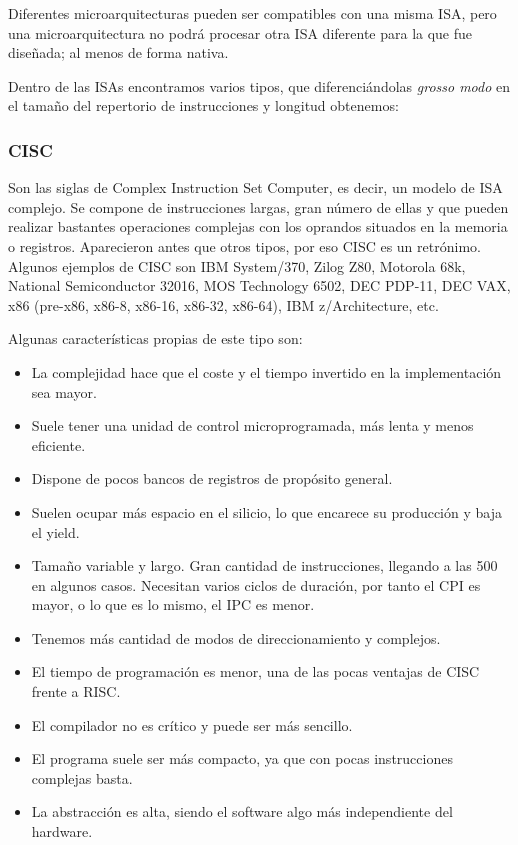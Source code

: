 \documentclass[a4paper, 11pt, titlepage]{article}
\begin{document}
            Diferentes microarquitecturas pueden ser compatibles con una misma ISA, pero una microarquitectura no 
            podrá procesar otra ISA diferente para la que fue diseñada; al menos de forma nativa.

            Dentro de las ISAs encontramos varios tipos, que diferenciándolas \textit{grosso modo} en el tamaño 
            del repertorio de instrucciones y longitud obtenemos:

        \subsubsection{CISC}
        
            Son las siglas de Complex Instruction Set Computer, es decir, un modelo de 
            ISA complejo. Se compone de instrucciones largas, gran número de ellas y que pueden realizar 
            bastantes operaciones complejas con los oprandos situados en la memoria o registros. Aparecieron 
            antes que otros tipos, por eso CISC es un retrónimo. Algunos ejemplos de CISC son IBM System/370, 
            Zilog Z80, Motorola 68k, National Semiconductor 32016, MOS Technology 6502, DEC PDP-11, DEC VAX, 
            x86 (pre-x86, x86-8, x86-16, x86-32, x86-64), IBM z/Architecture, etc.

            Algunas características propias de este tipo son:

            \begin{itemize}
                \item La complejidad hace que el coste y el tiempo invertido en la implementación sea mayor.
                \item Suele tener una unidad de control microprogramada, más lenta y menos eficiente.
                \item Dispone de pocos bancos de registros de propósito general.
                \item Suelen ocupar más espacio en el silicio, lo que encarece su producción y baja el yield.
                \item Tamaño variable y largo. Gran cantidad de instrucciones, llegando a las 500 en algunos casos. 
                Necesitan varios ciclos de duración, por tanto el CPI es mayor, o lo que es lo mismo, el IPC es menor.
                \item Tenemos más cantidad de modos de direccionamiento y complejos.
                \item El tiempo de programación es menor, una de las pocas ventajas de CISC frente a RISC.
                \item El compilador no es crítico y puede ser más sencillo.
                \item El programa suele ser más compacto, ya que con pocas instrucciones complejas basta.
                \item La abstracción es alta, siendo el software algo más independiente del hardware.
            \end{itemize}
\end{document}
